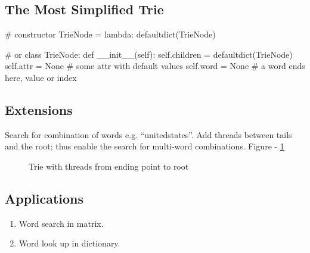 \subsection{The Most Simplified Trie}
\begin{python}
# constructor 
TrieNode = lambda: defaultdict(TrieNode) 

# or
class TrieNode:
    def __init__(self):
        self.children = defaultdict(TrieNode)
        self.attr = None  # some attr with default values
        self.word = None  # a word ends here, value or index
\end{python}
\subsection{Extensions}
 Search for combination of words e.g. ``unitedstates''. Add threads between tails and the root; thus enable the search for multi-word combinations. Figure - \ref{fig:trie2}
\begin{figure}[!hbt]
\centering
{}
\caption{Trie with threads from ending point to root}
\label{fig:trie2}
\end{figure}
\subsection{Applications}
\begin{enumerate}
\item Word search in matrix.
\item Word look up in dictionary.
\end{enumerate}
        
     
